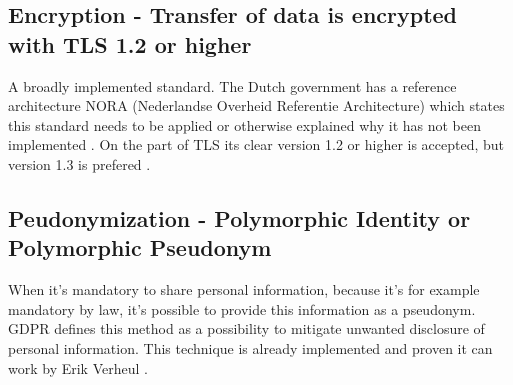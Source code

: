 \subsection{Encryption - Transfer of data is encrypted with TLS 1.2 or higher}
A broadly implemented standard. The Dutch government has a reference architecture NORA (Nederlandse Overheid Referentie Architecture) \cite{NORA} which states this standard needs to be applied or otherwise explained why it has not been implemented \cite{NORA_PasToeOfLegUit}. On the part of TLS its clear version 1.2 or higher is accepted, but version 1.3 is prefered \cite{NORA_TLS}. 

\subsection{Peudonymization - Polymorphic Identity or Polymorphic Pseudonym}
When it's mandatory to share personal information, because it's for example mandatory by law, it's possible to provide this information as a pseudonym. GDPR \cite{GDPR} defines this method as a possibility to mitigate unwanted disclosure of personal information. 
This technique is already implemented and proven it can work by Erik Verheul \cite{VerheuleID}. 

